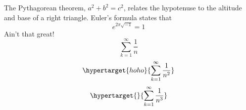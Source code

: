The Pythagorean theorem, $a^2 + b^2 = c^2$,
relates the hypotenuse to the altitude
and base of a right triangle.
Euler’s formula states that
\[
e^{2\pi \sqrt{-1}} = 1
\]
Ain’t that great!
\begin{equation*}
\sum_{k=1}^\infty \frac{1}{n}
\end{equation*}
\begin{equation}
\label{hoho}\hypertarget{hoho}{\sum_{k=1}^\infty \frac{1}{n^2}}
\end{equation}
\begin{equation}
\hypertarget{}{\sum_{k=1}^\infty \frac{1}{n^3}}
\end{equation}
